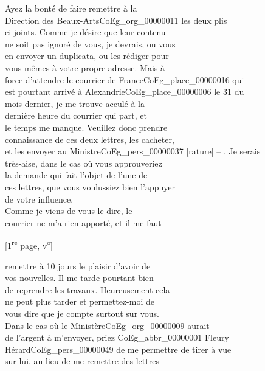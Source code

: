 \documentclass{book}
\begin{document}
\indent Ayez la bonté de faire remettre à la\\
Direction des Beaux-Arts\gls{CoEg_org_00000011} les deux plis\\
ci-joints. Comme je désire que leur contenu\\
ne soit pas ignoré de vous, je devrais, ou vous\\
en envoyer un duplicata, ou les rédiger pour\\
vous-mêmes à votre propre adresse. Mais à\\
force d’attendre le courrier de France\gls{CoEg_place_00000016} qui\\
est pourtant arrivé à Alexandrie\gls{CoEg_place_00000006} le 31 du\\
mois dernier, je me trouve acculé à la\\
dernière heure du courrier qui part, et\\
le temps me manque. Veuillez donc prendre\\
connaissance de ces deux lettres, les cacheter,\\
et les envoyer au Ministre\gls{CoEg_pers_00000037} [rature] – . Je serais\\
très-aise, dans le cas où vous approuveriez\\
la demande qui fait l’objet de l’une de\\
ces lettres, que vous voulussiez bien l’appuyer\\
de votre influence.\\
\indent Comme je viens de vous le dire, le\\
courrier ne m’a rien apporté, et il me faut
{\footnotesize \begin{center} {[1\textsuperscript{re} page, v\textsuperscript{o}]}\end{center}}
\noindent remettre à 10 jours le plaisir d’avoir de\\
vos nouvelles. Il me tarde pourtant bien\\
de reprendre les travaux. Heureusement cela\\
ne peut plus tarder et permettez-moi de\\
vous dire que je compte surtout sur vous.\\
\indent Dans le cas où le Ministère\gls{CoEg_org_00000009} aurait\\
de l’argent à m’envoyer, priez \gls{CoEg_abbr_00000001} Fleury\\
Hérard\gls{CoEg_pers_00000049} de me permettre de tirer à vue\\
sur lui, au lieu de me remettre des lettres\\
\end{document}
